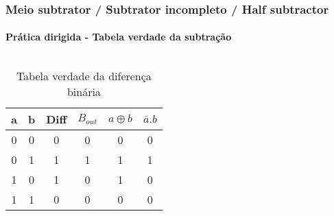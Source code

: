 \begin{frame}
	\frametitle{Meio subtrator / Subtrator incompleto / Half subtractor}
	\framesubtitle{\textbf{Prática dirigida} - Tabela verdade da subtração}
	\begin{columns}
		\begin{table}[h!]
			\centering
			\begin{tabular}{|c|c|c|c|c|c|}
				\hline
				a & b & Diff & \(B_{out}\)& \(a \oplus b\) & \(\overline{a}.b\) \\ \hline
				0 & 0 & 0   & 0          & 0              & 0             \\ \hline
				0 & 1 & 1   & 1          & 1              & 1             \\ \hline
				1 & 0 & 1   & 0          & 1              & 0             \\ \hline
				1 & 1 & 0   & 0          & 0              & 0             \\ \hline
			\end{tabular}
			\caption{Tabela verdade da diferença binária}
			\label{tab:binary_subtraction3}
		\end{table}
		\pause
		\begin{figure}
			\centering
			
			\label{fig:subtratorimcompleto}
		\end{figure}
	\end{columns}
\end{frame}




























